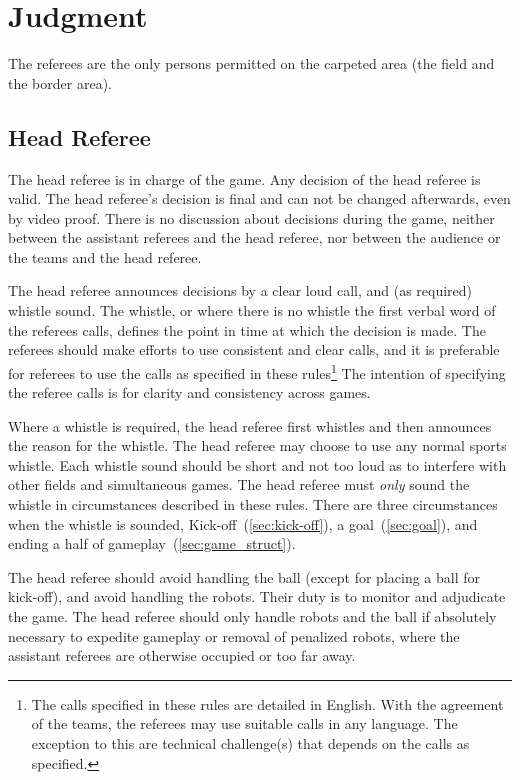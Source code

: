 \section{Judgment}
\label{sec:judgment}

The referees are the only persons permitted on the carpeted area (\ie the field and the border area).

\subsection{Head Referee}
\label{sec:head_referee}

The head referee is in charge of the game. Any decision of the head referee is valid. The head referee's decision is final and can not be changed afterwards, even by video proof. There is no discussion about decisions during the game, neither between the assistant referees and the head referee, nor between the audience or the teams and the head referee.

The head referee announces decisions by a clear loud call, and (as required) whistle sound.
The whistle, or where there is no whistle the first verbal word of the referees calls, defines the point in time at which the decision is made.
The referees should make efforts to use consistent and clear calls, and it is preferable for referees to use the calls as specified in these rules\footnote{The calls specified in these rules are detailed in English. With the agreement of the teams, the referees may use suitable calls in any language. The exception to this are technical challenge(s) that depends on the calls as specified.}
The intention of specifying the referee calls is for clarity and consistency across games.

Where a whistle is required, the head referee first whistles and then announces the reason for the whistle.
The head referee may choose to use any normal sports whistle.
Each whistle sound should be short and not too loud as to interfere with other fields and simultaneous games.
The head referee must \textit{only} sound the whistle in circumstances described in these rules.
There are three circumstances when the whistle is sounded, Kick-off~(\cf \cref{sec:kick-off}), a goal~(\cf \cref{sec:goal}), and ending a half of gameplay~(\cf \cref{sec:game_struct}).

The head referee should avoid handling the ball (except for placing a ball for kick-off), and avoid handling the robots.
Their duty is to monitor and adjudicate the game.
The head referee should only handle robots and the ball if absolutely necessary to expedite gameplay or removal of penalized robots, where the assistant referees are otherwise occupied or too far away.

